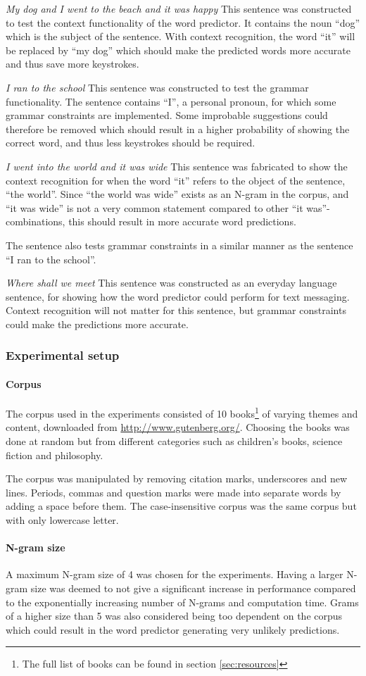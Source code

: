 \emph{My dog and I went to the beach and it was happy}
This sentence was constructed to test the context functionality of the word predictor. It contains the noun “dog” which is the subject of the sentence. With context recognition, the word “it” will be replaced by “my dog” which should make the predicted words more accurate and thus save more keystrokes.

\emph{I ran to the school}
This sentence was constructed to test the grammar functionality. The sentence contains “I”, a personal pronoun, for which some grammar constraints are implemented. Some improbable suggestions could therefore be removed which should result in a higher probability of showing the correct word, and thus less keystrokes should be required.

\emph{I went into the world and it was wide}
This sentence was fabricated to show the context recognition for when the word “it” refers to the object of the sentence, “the world”. Since “the world was wide” exists as an N-gram in the corpus, and “it was wide” is not a very common statement compared to other “it was”-combinations, this should result in more accurate word predictions.

The sentence also tests grammar constraints in a similar manner as the sentence “I ran to the school”.

\emph{Where shall we meet}
This sentence was constructed as an everyday language sentence, for showing how the word predictor could perform for text messaging. Context recognition will not matter for this sentence, but grammar constraints could make the predictions more accurate.

\subsubsection{Experimental setup}
\paragraph{Corpus}
The corpus used in the experiments consisted of 10 books\footnote{The full list of books can be found in section \ref{sec:resources}} of varying themes and content, downloaded from \url{http://www.gutenberg.org/}. Choosing the books was done at random but from different categories such as children's books, science fiction and philosophy.

The corpus was manipulated by removing citation marks, underscores and new lines. Periods, commas and question marks were made into separate words by adding a space before them. The case-insensitive corpus was the same corpus but with only lowercase letter.

\paragraph{N-gram size}
A maximum N-gram size of 4 was chosen for the experiments. Having a larger N-gram size was deemed to not give a significant increase in performance compared to the exponentially increasing number of N-grams and computation time. Grams of a higher size than 5 was also considered being too dependent on the corpus which could result in the word predictor generating very unlikely predictions.
